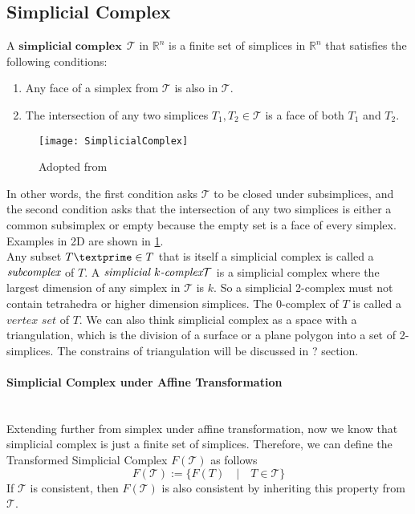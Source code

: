 \subsection{Simplicial Complex}
    \begin{definition*}
    A $\textbf{simplicial complex} ~~\mathcal T$ in $\mathbb{R}^n$ is a finite set of simplices in $\mathbb{R}^n$ that satisfies the following conditions:
    \begin{enumerate}[label =\arabic*.]
      \item Any face of a simplex from $\mathcal{T}$ is also in $\mathcal{T}$.
      \item The intersection of any two simplices ${T}_1, {T}_2 \in \mathcal{T}$ is a face of both ${T}_1$ and  ${T}_2$.
    \end{enumerate}
    \begin{figure}[b]
    \centering
    \texttt{[image: SimplicialComplex]}
    \caption[Simplicial Complex Example and Counterexample]{Adopted from~\cite{WEBSITE:1}}%
    \label{Fig1}
    \end{figure}
    \end{definition*}
    In other words, the first condition asks $\mathcal{T}$ to be closed under subsimplices, and the second condition asks that the intersection of any two simplices is either a common subsimplex or empty because the empty set is a face of every simplex. Examples in 2D are shown in \ref{Fig1}. \\
    \indent
    Any subset ${T\textprime}\in{T}$ that is itself a simplicial complex is called a $\emph{subcomplex}$ of ${T}$. A $\emph{simplicial $k$-complex} \mathcal T$ is a simplicial complex where the largest dimension of any simplex in $\mathcal T$ is ${k}$. So a simplicial 2-complex must not contain tetrahedra or higher dimension simplices. The 0-complex of ${T}$ is called a $\textit{vertex set}$ of ${T}$. We can also think simplicial complex as a space with a triangulation, which is the division of a surface or a plane polygon into a set of 2-simplices. The constrains of triangulation will be discussed in ? section.\\

    \paragraph{Simplicial Complex under Affine Transformation}\mbox{}\\
    Extending further from simplex under affine transformation, now we know that simplicial complex is just a finite set of simplices. Therefore, we can define the Transformed Simplicial Complex $F(\mathcal{T})$ as follows
    \begin{equation*}
    F(\mathcal{T}) := \{F(T) \quad \vert \quad T\in \mathcal{T}\}
    \end{equation*}
    If $\mathcal{T}$ is consistent, then $F(\mathcal{T})$ is also consistent by inheriting this property from $\mathcal{T}$.

